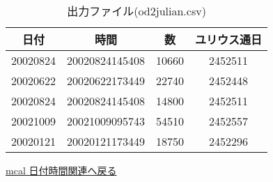 \begin{table}[hbt]
\begin{center}
 \caption{出力ファイル(od2julian.csv)}
  \begin{tabular}{|c|c|c|c|} \hline
日付&時間&数&ユリウス通日\\ \hline\hline
20020824&20020824145408&10660&2452511\\ \hline
20020622&20020622173449&22740&2452448\\ \hline
20020824&20020824145408&14800&2452511\\ \hline
20021009&20021009095743&54510&2452557\\ \hline
20020121&20020121173449&18750&2452296\\ \hline
  \end{tabular}
  \end{center}
\end{table}

\href{run:hizuke.pdf}{mcal 日付時間関連へ戻る}\\
%

